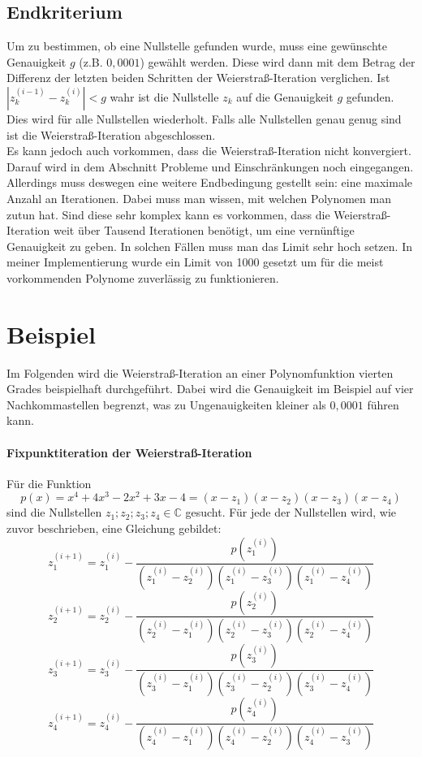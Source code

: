 \documentclass[12pt]{article}
\begin{document}
\subsection{Endkriterium}
Um zu bestimmen, ob eine Nullstelle gefunden wurde, muss eine gewünschte Genauigkeit $g$ (z.B. $0,0001$) gewählt werden. Diese wird dann mit dem Betrag der Differenz der letzten beiden Schritten der Weierstraß-Iteration verglichen. Ist $|z_k^{(i-1)}-z_k^{(i)}| < g$ wahr ist die Nullstelle $z_k$ auf die Genauigkeit $g$ gefunden. Dies wird für alle Nullstellen wiederholt. Falls alle Nullstellen genau genug sind ist die Weierstraß-Iteration abgeschlossen.\\
Es kann jedoch auch vorkommen, dass die Weierstraß-Iteration nicht konvergiert. Darauf wird in dem Abschnitt Probleme und Einschränkungen noch eingegangen. Allerdings muss deswegen eine weitere Endbedingung gestellt sein: eine maximale Anzahl an Iterationen. Dabei muss man wissen, mit welchen Polynomen man zutun hat. Sind diese sehr komplex kann es vorkommen, dass die Weierstraß-Iteration weit über Tausend Iterationen benötigt, um eine vernünftige Genauigkeit zu geben. In solchen Fällen muss man das Limit sehr hoch setzen. In meiner Implementierung wurde ein Limit von 1000 gesetzt um für die meist vorkommenden Polynome zuverlässig zu funktionieren.

\section{Beispiel}
Im Folgenden wird die Weierstraß-Iteration an einer Polynomfunktion vierten Grades beispielhaft durchgeführt. Dabei wird die Genauigkeit im Beispiel auf vier Nachkommastellen begrenzt, was zu Ungenauigkeiten kleiner als $0,0001$ führen kann.
\paragraph{Fixpunktiteration der Weierstraß-Iteration}
Für die Funktion
\begin{equation*}
    p(x) = x^4 + 4x^3 - 2x^2 + 3x - 4 = (x-z_1)(x-z_2)(x-z_3)(x-z_4)
\end{equation*}
sind die Nullstellen $z_1;z_2;z_3;z_4 \in \mathbb{C}$ gesucht. Für jede der Nullstellen wird, wie zuvor beschrieben, eine Gleichung gebildet:
\begin{equation*}
    z_1^{(i+1)} = z_1^{(i)}-\frac{p(z_1^{(i)})}{(z_1^{(i)}-z_2^{(i)})(z_1^{(i)}-z_3^{(i)})(z_1^{(i)}-z_4^{(i)})}
\end{equation*}
\begin{equation*}
    z_2^{(i+1)} = z_2^{(i)}-\frac{p(z_2^{(i)})}{(z_2^{(i)}-z_1^{(i)})(z_2^{(i)}-z_3^{(i)})(z_2^{(i)}-z_4^{(i)})}
\end{equation*}
\begin{equation*}
    z_3^{(i+1)} = z_3^{(i)}-\frac{p(z_3^{(i)})}{(z_3^{(i)}-z_1^{(i)})(z_3^{(i)}-z_2^{(i)})(z_3^{(i)}-z_4^{(i)})}
\end{equation*}
\begin{equation*}
    z_4^{(i+1)} = z_4^{(i)}-\frac{p(z_4^{(i)})}{(z_4^{(i)}-z_1^{(i)})(z_4^{(i)}-z_2^{(i)})(z_4^{(i)}-z_3^{(i)})}
\end{equation*}
\end{document}
